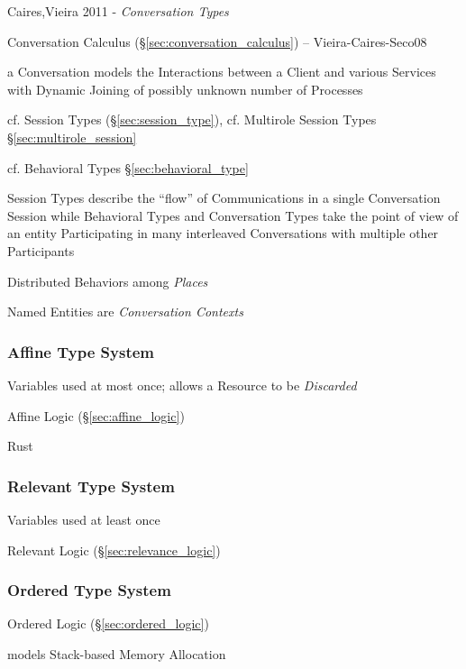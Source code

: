 Caires,Vieira 2011 - \emph{Conversation Types}


\fist Conversation Calculus (\S\ref{sec:conversation_calculus}) --
Vieira-Caires-Seco08

a Conversation models the Interactions between a Client and various
Services with Dynamic Joining of possibly unknown number of Processes

\fist cf. Session Types (\S\ref{sec:session_type}), \fist cf.
Multirole Session Types \S\ref{sec:multirole_session}

\fist cf. Behavioral Types \S\ref{sec:behavioral_type}

Session Types describe the ``flow'' of Communications in a single
Conversation Session while Behavioral Types and Conversation Types
take the point of view of an entity Participating in many interleaved
Conversations with multiple other Participants

Distributed Behaviors among \emph{Places}

Named Entities are \emph{Conversation Contexts}



\subsubsection{Affine Type System}\label{sec:affine_type}\hfill

Variables used at most once; allows a Resource to be \emph{Discarded}

Affine Logic (\S\ref{sec:affine_logic})

Rust



\subsubsection{Relevant Type System}\label{sec:relevant_type}

Variables used at least once

Relevant Logic (\S\ref{sec:relevance_logic})



\subsubsection{Ordered Type System}\label{sec:ordered_type}

\fist Ordered Logic (\S\ref{sec:ordered_logic})

models Stack-based Memory Allocation

